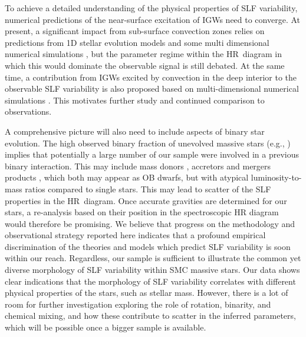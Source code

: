 \documentclass[fleqn,usenatbib]{mnras}
\begin{document}
To achieve a detailed understanding of the physical properties of SLF variability, numerical predictions of the near-surface excitation of IGWs need to converge. At present, a significant impact from sub-surface convection zones relies on predictions from 1D stellar evolution models  \citep{Cantiello+2009,Grassitelli+2015,Jermyn+2022} and some multi dimensional numerical simulations \citep{Schultz2022a,Debnath+2024}, but the parameter regime within the HR~diagram in which this would dominate the observable signal is still debated. At the same time, a contribution from IGWs excited by convection in the deep interior to the observable SLF variability is also proposed based on multi-dimensional numerical simulations \citep{Rogers2015, Edelmann+2019ApJ, Thompson+2024_3Dsim, Pathak+2025}. This motivates further study and continued comparison to observations.

A comprehensive picture will also need to include aspects of binary star evolution. The high observed binary fraction of unevolved massive stars (e.g., \citealt{Sana+2012, MarchantBodensteiner2024}) implies that potentially a large number of our sample were involved in a previous binary interaction. This may include mass donors \citep{Pauli+2022}, accretors \citep{Renzo+2021,Richards+2025} and mergers products \citep{Henneco+2024a, Henneco+2024b, Menon+2024}, which both may appear as OB dwarfs, but with atypical luminosity-to-mass ratios compared to single stars. This may lead to scatter of the SLF properties in the HR~diagram. Once accurate gravities are determined for our stars, a re-analysis based on their position in the spectroscopic HR diagram would therefore be promising. We believe that progress on the methodology and observational strategy reported here indicates that a profound empirical discrimination of the theories and models which predict SLF variability is soon within our reach. Regardless, our sample is sufficient to illustrate the common yet diverse morphology of SLF variability within SMC massive stars. Our data shows clear indications that the morphology of SLF variability correlates with different physical properties of the stars, such as stellar mass. However, there is a lot of room for further investigation exploring the role of rotation, binarity, and chemical mixing, and how these contribute to scatter in the inferred parameters, which will be possible once a bigger sample is available.
\end{document}
